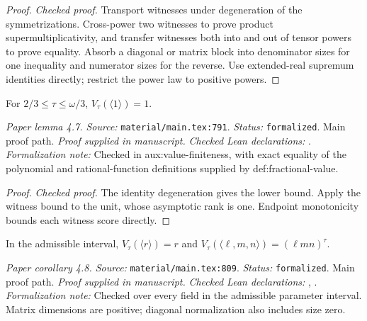 \begin{proof}
\leanok
{}
\textit{Checked proof.} Transport witnesses under degeneration of the symmetrizations. Cross-power two witnesses to prove product supermultiplicativity, and transfer witnesses both into and out of tensor powers to prove equality. Absorb a diagonal or matrix block into denominator sizes for one inequality and numerator sizes for the reverse. Use extended-real supremum identities directly; restrict the power law to positive powers.
\end{proof}

\renewcommand{\thetheorem}{4.7}
\begin{lemma}
\label{lem:value-unit}
\manuscriptproof
{}
\leanok
For $2/3\le\tau\le\omega/3$, $V_\tau(\langle1\rangle)=1$.
\end{lemma}

\noindent\textit{Paper lemma 4.7. Source:} \texttt{material/main.tex:791}.
\textit{Status:} \texttt{formalized}. Main proof path.
\textit{Proof supplied in manuscript.}
\textit{Checked Lean declarations:} .
\textit{Formalization note:} Checked in aux:value-finiteness, with exact equality of the polynomial and rational-function definitions supplied by def:fractional-value.

\begin{proof}
\leanok
{}
\textit{Checked proof.} The identity degeneration gives the lower bound. Apply the witness bound to the unit, whose asymptotic rank is one. Endpoint monotonicity bounds each witness score directly.
\end{proof}

\renewcommand{\thetheorem}{4.8}
\begin{corollary}
\label{cor:value-diag-matrix}
\manuscriptproof
{}
\leanok
In the admissible interval, $V_\tau(\langle r\rangle)=r$ and $V_\tau(\langle\ell,m,n\rangle)=(\ell mn)^\tau$.
\end{corollary}

\noindent\textit{Paper corollary 4.8. Source:} \texttt{material/main.tex:809}.
\textit{Status:} \texttt{formalized}. Main proof path.
\textit{Proof supplied in manuscript.}
\textit{Checked Lean declarations:} , .
\textit{Formalization note:} Checked over every field in the admissible parameter interval. Matrix dimensions are positive; diagonal normalization also includes size zero.

